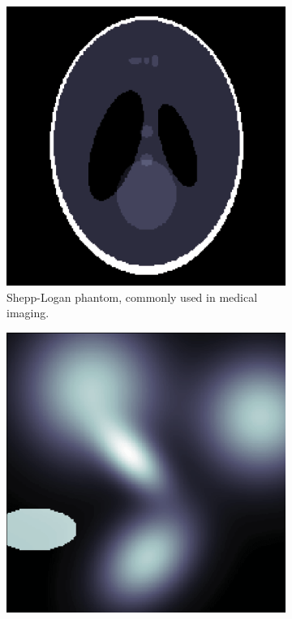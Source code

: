 \begin{figure}
    \centering
    \begin{subfigure}[t]{0.45\textwidth}
    \begin{center}
        \includegraphics[width=\textwidth]{img/png/shepp_logan.png}
    \end{center}
    \caption{Shepp-Logan phantom, commonly used in medical imaging.}
    \label{fig:shepplogan}
    \end{subfigure}
    \hfill
    \begin{subfigure}[t]{0.45\textwidth}
    \begin{center}
        \includegraphics[width=\textwidth]{img/png/spectral.png}

\end{center}
\end{subfigure}
\end{figure}
